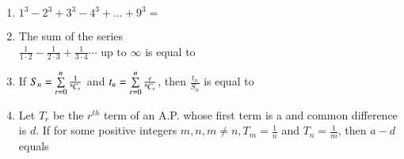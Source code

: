 \documentclass[journal]{IEEEtran}
\begin{document}
\begin{enumerate}[label={\arabic*.}]
\begin{enumerate}
\end{enumerate} 

\item {$1^{3}-2^{3}+3^{3}-4^{3}+...
+9^{3}=$}
{\hfill{}} 
\begin{enumerate}
\end{enumerate}

\item {The sum of the series \\ $\frac{1}{1\cdot2}-\frac{1}{2\cdot3}+\frac{1}{3\cdot4}\cdots \text{ up to } \infty$ is equal to} 
{\hfill{}} 
\begin{enumerate}
\end{enumerate}

\item {If $S_n = \sum\limits_{r=0}^{n} \frac{1}{{{}^{n}\mkern-1muC_{r}}}$ and $t_n = \sum\limits_{r=0}^{n} \frac{r}{{{}^{n}\mkern-1muC_{r}}}$, then $\frac{t_n}{S_n}$ is equal to}
{\hfill{}} 
\begin{enumerate}
\end{enumerate}

\item {Let $T_r$ be the $r^{th}$ term of an A.P. whose first term is a and common difference is $d$. If for some positive integers $m,n, m\neq n, T_m = \frac{1}{n}$ and $T_n = \frac{1}{m}$, then $a-d$ equals} 
{\hfill{}}
\begin{enumerate}
\end{enumerate}


\end{enumerate}
\end{document}
